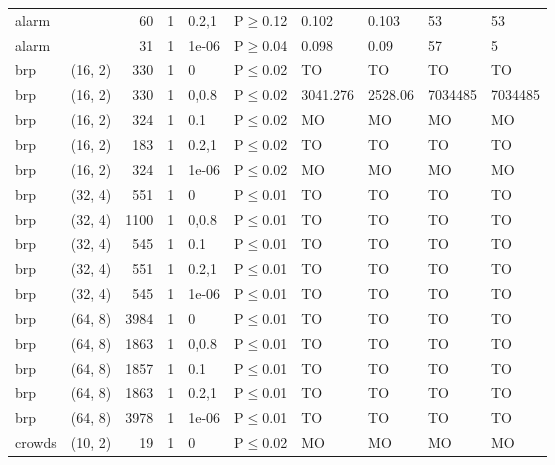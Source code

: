 \begin{longtable}{llrrllllll}
 alarm         &          &     	60 & 1 & 0.2,1 & P$\geq$0.12  & 0.102    & 0.103    & 53      & 53      \\
 alarm         &          &     	31 & 1 & 1e-06 & P$\geq$0.04  & 0.098    & 0.09     & 57      & 5       \\
 brp           & (16, 2)  &    	330 & 1 & 0     & P$\leq$0.02  & TO       & TO       & TO      & TO      \\
 brp           & (16, 2)  &    	330 & 1 & 0,0.8 & P$\leq$0.02  & 3041.276 & 2528.06  & 7034485 & 7034485 \\
 brp           & (16, 2)  &    	324 & 1 & 0.1   & P$\leq$0.02  & MO       & MO       & MO      & MO      \\
 brp           & (16, 2)  &    	183 & 1 & 0.2,1 & P$\leq$0.02  & TO       & TO       & TO      & TO      \\
 brp           & (16, 2)  &    	324 & 1 & 1e-06 & P$\leq$0.02  & MO       & MO       & MO      & MO      \\
 brp           & (32, 4)  &    	551 & 1 & 0     & P$\leq$0.01  & TO       & TO       & TO      & TO      \\
 brp           & (32, 4)  &   	1100 & 1 & 0,0.8 & P$\leq$0.01  & TO       & TO       & TO      & TO      \\
 brp           & (32, 4)  &    	545 & 1 & 0.1   & P$\leq$0.01  & TO       & TO       & TO      & TO      \\
 brp           & (32, 4)  &    	551 & 1 & 0.2,1 & P$\leq$0.01  & TO       & TO       & TO      & TO      \\
 brp           & (32, 4)  &    	545 & 1 & 1e-06 & P$\leq$0.01  & TO       & TO       & TO      & TO      \\
 brp           & (64, 8)  &   	3984 & 1 & 0     & P$\leq$0.01  & TO       & TO       & TO      & TO      \\
 brp           & (64, 8)  &   	1863 & 1 & 0,0.8 & P$\leq$0.01  & TO       & TO       & TO      & TO      \\
 brp           & (64, 8)  &   	1857 & 1 & 0.1   & P$\leq$0.01  & TO       & TO       & TO      & TO      \\
 brp           & (64, 8)  &   	1863 & 1 & 0.2,1 & P$\leq$0.01  & TO       & TO       & TO      & TO      \\
 brp           & (64, 8)  &   	3978 & 1 & 1e-06 & P$\leq$0.01  & TO       & TO       & TO      & TO      \\
 crowds        & (10, 2)  &     	19 & 1 & 0     & P$\leq$0.02  & MO       & MO       & MO      & MO      \\

\end{longtable}
